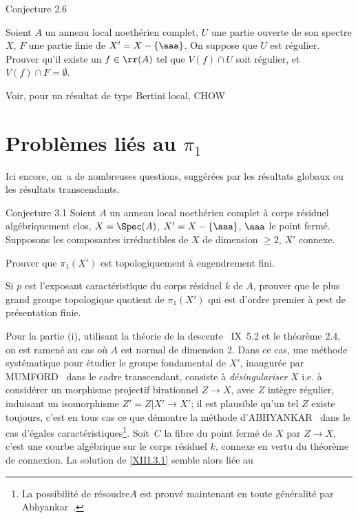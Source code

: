\label{XIII.2.6}
\begin{enonce*}{Conjecture 2.6\ndemark}

Soient $A$ un anneau local noeth\'erien complet, $U$ une partie ouverte de son spectre $X$, $F$ une partie finie de $X'=X-\{ \aaa\}$. On suppose que $U$ est r\'egulier. Prouver qu'il existe un $f \in\rr(A)$ tel que $V(f)\cap U$ soit r\'egulier, et $V(f)\cap F=\emptyset$.
\end{enonce*}

Voir, pour un r\'esultat de type \og Bertini local\fg, CHOW~\cite{XIII.2}

\section{Probl\`emes li\'es au $\pi_1$} \label{XIII.3} Ici encore, on~a de nombreuses questions, sugg\'er\'ees par les r\'esultats globaux ou les r\'esultats transcendants.

\label{XIII.3.1}
\begin{enonce*}{Conjecture 3.1\ndemark} Soient $A$ un anneau local noeth\'erien complet \`a corps r\'esiduel alg\'ebriquement clos, $X=\Spec (A)$, $ X'= X- \{\aaa\}$, $\aaa$ le point ferm\'e. Supposons les composantes irr\'eductibles de $X$ de dimension $\ge 2$, $X'$ connexe.
\begin{enumeratei}
\item
Prouver que $\pi_1(X')$ est topologiquement \`a engendrement fini.
\item
Si $p$ est l'exposant caract\'eristique du corps r\'esiduel $k$ de $A$, prouver que le plus grand groupe topologique quotient de $\pi_1(X')$ qui est \og d'ordre premier \`a $p$\fg est de pr\'esentation finie.
\end{enumeratei}
\end{enonce*}

Pour la partie (i), utilisant la th\'eorie de la descente ~IX~5.2 et le th\'eor\`eme 2.4, on est ramen\'e au cas o\`u $A$ est normal de dimension $2$. Dans ce cas, une m\'ethode syst\'ematique pour \'etudier le groupe fondamental de $X'$, inaugur\'ee par MUMFORD~\cite{XIII.5} dans le cadre transcendant, consiste \`a \emph{désingulariser} $X$ i.e. \`a consid\'erer un morphisme projectif birationnel $Z\to X$, avec $Z$ int\`egre r\'egulier, induisant un isomorphisme $Z'=Z|X'\to X'$; il est plausible qu'un tel $Z$ existe toujours, c'est en tous cas ce que d\'emontre la m\'ethode d'ABHYANKAR~\cite{XIII.1} dans le cas d'\og \'egales caract\'eristiques{\fg}\footnote{La possibilit\'e de \og r\'esoudre\fg $A$ est prouv\'e maintenant en toute g\'en\'eralit\'e par Abhyankar~\cite{XIII.8}.}. Soit~$C$ la fibre du point ferm\'e de $X$ par $Z\to X$, c'est une courbe alg\'ebrique sur le corps r\'esiduel $k$, connexe en vertu du th\'eor\`eme de connexion. La solution de \ref{XIII.3.1} semble alors li\'ee au

